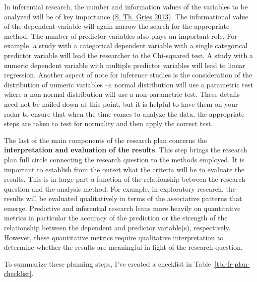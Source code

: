\documentclass[
  letterpaper,
  DIV=11,
  numbers=noendperiod]{scrreport}
\theoremstyle{definition}
\theoremstyle{remark}
\begin{document}
In inferential research, the number and information values of the
variables to be analyzed will be of key importance
(\protect\hyperlink{ref-Gries2013a}{S. Th. Gries 2013}). The
informational value of the dependent variable will again narrow the
search for the appropriate method. The number of predictor variables
also plays an important role. For example, a study with a categorical
dependent variable with a single categorical predictor variable will
lead the researcher to the Chi-squared test. A study with a numeric
dependent variable with multiple predictor variables will lead to linear
regression. Another aspect of note for inference studies is the
consideration of the distribution of numeric variables --a normal
distribution will use a parametric test where a non-normal distribution
will use a non-parametric test. These details need not be nailed down at
this point, but it is helpful to have them on your radar to ensure that
when the time comes to analyze the data, the appropriate steps are taken
to test for normality and then apply the correct test.

The last of the main components of the research plan concerns the
\textbf{interpretation and evaluation of the results}. This step brings
the research plan full circle connecting the research question to the
methods employed. It is important to establish from the outset what the
criteria will be to evaluate the results. This is in large part a
function of the relationship between the research question and the
analysis method. For example, in exploratory research, the results will
be evaluated qualitatively in terms of the associative patterns that
emerge. Predictive and inferential research leans more heavily on
quantitative metrics in particular the accuracy of the prediction or the
strength of the relationship between the dependent and predictor
variable(s), respectively. However, these quantitative metrics require
qualitative interpretation to determine whether the results are
meaningful in light of the research question.

To summarize these planning steps, I've created a checklist in
Table~\ref{tbl-fr-plan-checklist}.
\end{document}
